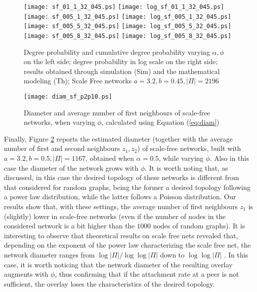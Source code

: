 \documentclass[a4paper,twosided]{article}
\begin{document}
\begin{figure}
   \centering
   \texttt{[image: sf\_01\_1\_32\_045.ps]}
   \texttt{[image: log\_sf\_01\_1\_32\_045.ps]}
   \texttt{[image: sf\_005\_1\_32\_045.ps]}
   \texttt{[image: log\_sf\_005\_1\_32\_045.ps]}
   \texttt{[image: sf\_005\_5\_32\_045.ps]}
   \texttt{[image: log\_sf\_005\_5\_32\_045.ps]}
   \texttt{[image: sf\_005\_8\_32\_045.ps]}
   \texttt{[image: log\_sf\_005\_8\_32\_045.ps]}
   \caption{Degree probability and cumulative degree probability varying $\alpha, \phi$ on the left side; degree probability in log scale on the right side; results obtained through simulation (Sim) and the mathematical modeling (Th); Scale Free networks $a=3.2, b=0.45, |\Pi|=2196$}
   \label{fig:fig_sf14}
\end{figure}



\begin{figure}
   \centering
   \texttt{[image: diam\_sf\_p2p10.ps]}
   \caption{Diameter and average number of first neighbours of scale-free networks, when varying $\phi$, calculated using Equation (\ref{eq:diam})}
   \label{fig:diam_sf}
\end{figure}

Finally, Figure \ref{fig:diam_sf} reports the estimated diameter (together with the average number of first and second neighbours $z_1, z_2$) of scale-free networks, built with $a=3.2, b=0.5, |\Pi| = 1167$, obtained when $\alpha=0.5$, while varying $\phi$.
Also in this case the diameter of the network grows with $\phi$. It is worth noting that, as discussed, in this case the desired topology of these networks is different from that considered for random graphs, being the former a desired topology following a power law distribution, while the latter follows a Poisson distribution. 
Our results show that, with these settings, the average number of first neighbours $z_1$ is (slightly) lower in scale-free networks (even if the number of nodes in the considered network is a bit higher than the $1000$ nodes of random graphs). 
It is interesting to observe that theoretical results on scale free nets revealed that, depending on the exponent of the power law characterizing the scale free net, the network diameter ranges from $\log{|\Pi|}/\log \log{|\Pi|}$ down to $\log \log{|\Pi|}$
\cite{Verlag03structuralproperties,simutools,pyun,bollobas_diam}. 
In this case, it is worth noticing that the network diameter of the resulting overlay augments with $\phi$, thus confirming that if the attachment rate at a peer is not sufficient, the overlay loses the characteristics of the desired topology.
\end{document}
